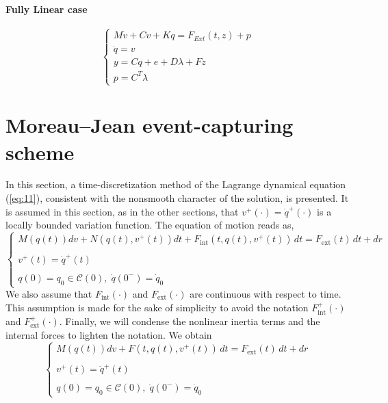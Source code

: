 \paragraph{Fully Linear case}

\begin{equation}
  \label{eq:FullyLinear}
  \begin{cases}
    M \dot v   +C v + Kq = F_{Ext}(t, z) + p  \\
    \dot q = v \\
    y = C q + e + D\lambda  + F z \\
    p = C^T\lambda
  \end{cases}
\end{equation}




\section{Moreau--Jean event-capturing scheme} 

In this section, a time-discretization method of the Lagrange dynamical equation (\ref{eq:11}), consistent with the nonsmooth character of the solution, is presented. It is assumed in this section, as in the other sections, that $v^+(\cdot)=\dot{q}^{+}(\cdot)$  is a locally bounded variation function. The equation of motion reads as,
\begin{equation}
  \label{eq:11-b}
  \begin{cases}
    M(q(t)) {dv} +N(q(t),v^{+}(t)) dt+  F_{\mathrm{int}}(t, q(t), v^+(t))\,dt = F_{\mathrm{ext}}(t)\,dt + dr \\ \\
   v^+(t)=\dot{q}^+(t) \\ \\
  q(0)=q_{0} \in {\mathcal C}(0),\;\dot{q}(0^{-})=\dot{q}_{0}
  \end{cases}    
\end{equation}
We also assume that $F_{\mathrm{int}}(\cdot)$ and $F_{\mathrm{ext}}(\cdot)$ are continuous with respect to time. This assumption is made for the sake of simplicity to avoid the notation $F^+_{\mathrm{int}}(\cdot)$ and $F^+_{\mathrm{ext}}(\cdot)$. Finally, we will condense the nonlinear inertia terms and the internal forces to lighten the notation. We obtain 
\begin{equation}
  \label{eq:11-c}
  \begin{cases}
    M(q(t)) {dv} + F(t, q(t), v^+(t))\,dt = F_{\mathrm{ext}}(t)\,dt + dr \\ \\
   v^+(t)=\dot{q}^+(t) \\ \\
  q(0)=q_{0} \in {\mathcal C}(0),\;\dot{q}(0^{-})=\dot{q}_{0}
  \end{cases}    
\end{equation}

